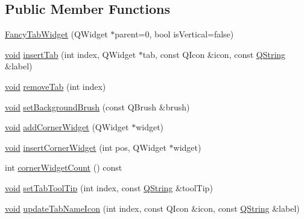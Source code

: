 \subsection*{\-Public \-Member \-Functions}
\begin{DoxyCompactItemize}
\item 
\hyperlink{group___core_plugin_ga613267396e22b38e5decd277c32ec677}{\-Fancy\-Tab\-Widget} (\-Q\-Widget $\ast$parent=0, bool is\-Vertical=false)
\item 
\hyperlink{group___u_a_v_objects_plugin_ga444cf2ff3f0ecbe028adce838d373f5c}{void} \hyperlink{group___core_plugin_ga835076793ff92fcdbd7d496856ffd7a3}{insert\-Tab} (int index, \-Q\-Widget $\ast$tab, const \-Q\-Icon \&icon, const \hyperlink{group___u_a_v_objects_plugin_gab9d252f49c333c94a72f97ce3105a32d}{\-Q\-String} \&label)
\item 
\hyperlink{group___u_a_v_objects_plugin_ga444cf2ff3f0ecbe028adce838d373f5c}{void} \hyperlink{group___core_plugin_ga97b9e10d9f0aa2be2fff83cba46e1d29}{remove\-Tab} (int index)
\item 
\hyperlink{group___u_a_v_objects_plugin_ga444cf2ff3f0ecbe028adce838d373f5c}{void} \hyperlink{group___core_plugin_gabedd59a53dfd1c5abff89f6deb134cab}{set\-Background\-Brush} (const \-Q\-Brush \&brush)
\item 
\hyperlink{group___u_a_v_objects_plugin_ga444cf2ff3f0ecbe028adce838d373f5c}{void} \hyperlink{group___core_plugin_ga78144a9e9cee024583d1a5fec9332e67}{add\-Corner\-Widget} (\-Q\-Widget $\ast$widget)
\item 
\hyperlink{group___u_a_v_objects_plugin_ga444cf2ff3f0ecbe028adce838d373f5c}{void} \hyperlink{group___core_plugin_gabfaa2256cd7b55c58fa3f58b086ea922}{insert\-Corner\-Widget} (int pos, \-Q\-Widget $\ast$widget)
\item 
int \hyperlink{group___core_plugin_ga5ac9f922ffa0e17cff4f319d2435e2cb}{corner\-Widget\-Count} () const 
\item 
\hyperlink{group___u_a_v_objects_plugin_ga444cf2ff3f0ecbe028adce838d373f5c}{void} \hyperlink{group___core_plugin_gab6310d99d182cd768b9d1ad93de69917}{set\-Tab\-Tool\-Tip} (int index, const \hyperlink{group___u_a_v_objects_plugin_gab9d252f49c333c94a72f97ce3105a32d}{\-Q\-String} \&tool\-Tip)
\item 
\hyperlink{group___u_a_v_objects_plugin_ga444cf2ff3f0ecbe028adce838d373f5c}{void} \hyperlink{group___core_plugin_ga60b5443453a15ccc38967ada38627ea9}{update\-Tab\-Name\-Icon} (int index, const \-Q\-Icon \&icon, const \hyperlink{group___u_a_v_objects_plugin_gab9d252f49c333c94a72f97ce3105a32d}{\-Q\-String} \&label)

\end{DoxyCompactItemize}
